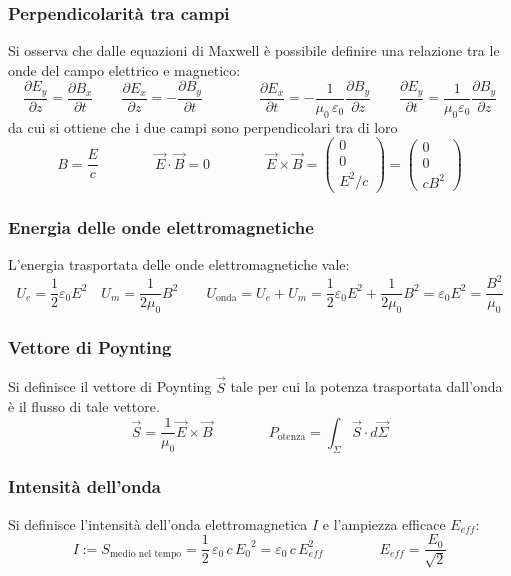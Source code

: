 \documentclass[a4paper]{article}
\begin{document}
\subsubsection*{Perpendicolarità tra campi}
Si osserva che dalle equazioni di Maxwell è possibile definire una relazione tra le onde del campo elettrico e magnetico:
\[\frac{\partial E_y}{\partial z} = \frac{\partial B_x}{\partial t} \qquad \frac{\partial E_x}{\partial z} = - \frac{\partial B_y}{ \partial t} \qquad\qquad
\frac{\partial E_x}{\partial t} = -\frac{1}{\mu_0 \, \varepsilon_0} \frac{\partial B_y}{\partial z} \qquad \frac{\partial E_y}{\partial t} = \frac{1}{\mu_0 \varepsilon_0} \frac{\partial B_y}{\partial z}\]
da cui si ottiene che i due campi sono perpendicolari tra di loro
\[B = \frac{E}{c} \qquad\qquad \vec{E} \cdot \vec{B} = 0 \qquad\qquad \vec{E} \times \vec{B} = \left( \begin{matrix} 0 \\ 0 \\ E^2/c \end{matrix} \right) = \left( \begin{matrix} 0 \\ 0 \\ cB^2 \end{matrix} \right)\]

\subsubsection*{Energia delle onde elettromagnetiche}
L'energia trasportata delle onde elettromagnetiche vale:
\[U_e = \frac{1}{2} \varepsilon_0 E^2 \quad U_m = \frac{1}{2\mu_0} B^2 \qquad U_\text{onda} = U_e + U_m = \frac{1}{2} \varepsilon_0 E^2 + \frac{1}{2\mu_0} B^2 = \varepsilon_0 E^2 = \frac{B^2}{\mu_0}\]

\subsubsection*{Vettore di Poynting}
Si definisce il vettore di Poynting \(\vec{S}\) tale per cui la potenza trasportata dall'onda è il flusso di tale vettore.
\[\vec{S} = \frac{1}{\mu_0} \vec{E} \times \vec{B} \qquad \qquad P_\text{otenza} = \int_\Sigma \vec{S} \cdot d\vec{\Sigma}\]

\subsubsection*{Intensità dell'onda}
Si definisce l'intensità dell'onda elettromagnetica \(I\) e l'ampiezza efficace \(E_{eff}\):
\[I := S_\text{medio nel tempo} = \frac{1}{2} \, \varepsilon_0 \, c \, {E_0}^2 = \varepsilon_0 \, c \, E_{eff}^2 \qquad\qquad E_{eff} = \frac{E_0}{\sqrt{2}}\]
\end{document}
